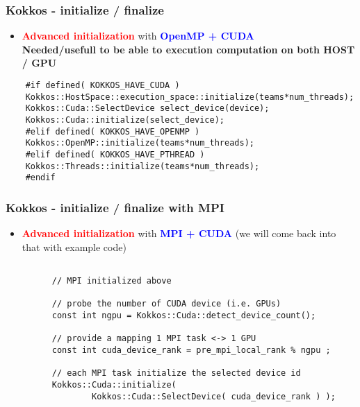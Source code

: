 \begin{frame}[fragile=singleslide]
  \frametitle{Kokkos - initialize / finalize}

  \begin{itemize}
  \item \textcolor{red}{\textbf{Advanced initialization}} with \textcolor{blue}{\textbf{OpenMP + CUDA}}\\
    \textbf{Needed/usefull to be able to execution computation on both HOST / GPU}
  \end{itemize}
  \begin{verbatim}
    #if defined( KOKKOS_HAVE_CUDA )
    Kokkos::HostSpace::execution_space::initialize(teams*num_threads);
    Kokkos::Cuda::SelectDevice select_device(device);
    Kokkos::Cuda::initialize(select_device);
    #elif defined( KOKKOS_HAVE_OPENMP )
    Kokkos::OpenMP::initialize(teams*num_threads);
    #elif defined( KOKKOS_HAVE_PTHREAD )
    Kokkos::Threads::initialize(teams*num_threads);
    #endif
  \end{verbatim}
\end{frame}


\begin{frame}[fragile=singleslide]
  \frametitle{Kokkos - initialize / finalize with MPI}

  \begin{itemize}
  \item \textcolor{red}{\textbf{Advanced initialization}} with \textcolor{blue}{\textbf{MPI + CUDA}}
    (we will come back into that with example code)
    \begin{verbatim}

      // MPI initialized above

      // probe the number of CUDA device (i.e. GPUs)
      const int ngpu = Kokkos::Cuda::detect_device_count();

      // provide a mapping 1 MPI task <-> 1 GPU
      const int cuda_device_rank = pre_mpi_local_rank % ngpu ;

      // each MPI task initialize the selected device id
      Kokkos::Cuda::initialize(
              Kokkos::Cuda::SelectDevice( cuda_device_rank ) );
    \end{verbatim}
  \end{itemize}
\end{frame}
